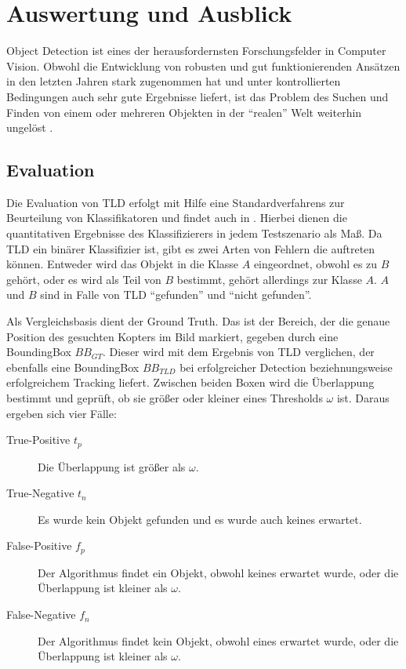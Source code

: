 \section{Auswertung und Ausblick}
Object Detection ist eines der herausfordernsten Forschungsfelder in Computer Vision. Obwohl die Entwicklung von robusten und gut funktionierenden Ansätzen in den letzten Jahren stark zugenommen hat und unter kontrollierten Bedingungen auch sehr gute Ergebnisse liefert, ist das Problem des Suchen und Finden von einem oder mehreren Objekten in der ``realen'' Welt weiterhin ungelöst \cite{ODS}.

\subsection{Evaluation}
	Die Evaluation von TLD erfolgt mit Hilfe eine Standardverfahrens zur Beurteilung von Klassifikatoren und findet auch in \cite{TLD}. Hierbei dienen die quantitativen Ergebnisse des Klassifizierers in jedem Testszenario als Maß. Da TLD ein binärer Klassifizier ist, gibt es zwei Arten von Fehlern die auftreten können. Entweder wird das Objekt in die Klasse $A$ eingeordnet, obwohl es zu $B$ gehört, oder es wird als Teil von $B$ bestimmt, gehört allerdings zur Klasse $A$. $A$ und $B$ sind in Falle von TLD ``gefunden'' und ``nicht gefunden''.
	
	Als Vergleichsbasis dient der Ground Truth. Das ist der Bereich, der die genaue Position des gesuchten Kopters im Bild markiert, gegeben durch eine BoundingBox $BB_{GT}$. Dieser wird mit dem Ergebnis von TLD verglichen, der ebenfalls eine BoundingBox $BB_{TLD}$ bei erfolgreicher Detection beziehnungsweise erfolgreichem Tracking liefert. Zwischen beiden Boxen wird die Überlappung bestimmt und geprüft, ob sie größer oder kleiner eines Thresholds $\omega$ ist. Daraus ergeben sich vier Fälle:

	\begin{description}
	\item [True-Positive $t_p$] Die Überlappung ist größer als $\omega$.
	\item [True-Negative $t_n$] Es wurde kein Objekt gefunden und es wurde auch keines erwartet.
	\item [False-Positive $f_p$] Der Algorithmus findet ein Objekt, obwohl keines erwartet wurde, oder die Überlappung ist kleiner als $\omega$.
	\item [False-Negative $f_n$] Der Algorithmus findet kein Objekt, obwohl eines erwartet wurde, oder die Überlappung ist kleiner als $\omega$.
	\end{description}

